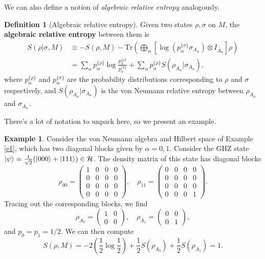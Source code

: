 \documentclass[12pt,a4paper]{report}
\numberwithin{equation}{section}
\newcommand{\ol}[1]{\overline{#1}}
\newcommand{\tr}{\text{Tr}}
\theoremstyle{definition}
\newtheorem{definition}{Definition}[section]
\theoremstyle{theorem}
\theoremstyle{theorem}
\theoremstyle{example}
\newtheorem{example}{Example}[section]
\theoremstyle{definition}
\begin{document}
We can also define a notion of \textit{algebraic relative entropy} analogously.
\begin{definition}[Algebraic relative entropy]
	Given two states $\rho,\sigma$ on $M$, the \textbf{algebraic relative entropy} between them is
	\begin{equation}
		\begin{aligned}
			S(\rho|\sigma,M)&\equiv-S(\rho,M)-\tr\left(\bigoplus_{\alpha}\left[\log\left(p_{\alpha}^{\{\sigma\}}\sigma_{A_{\alpha}}\right)\otimes I_{\ol{A}_{\alpha}}\right]\rho\right)\\&=\sum_{\alpha}p_{\alpha}^{\{\rho\}}\log\frac{p_{\alpha}^{\{\rho\}}}{p_{\alpha}^{\{\sigma\}}}+\sum_{\alpha}p_{\alpha}^{\{\rho\}}S(\rho_{A_{\alpha}}|\sigma_{A_{\alpha}}),
		\end{aligned}
	\end{equation}
	where $p_{\alpha}^{\{\rho\}}$ and $p_{\alpha}^{\{\sigma\}}$ are the probability distributions corresponding to $\rho$ and $\sigma$ respectively, and $S(\rho_{A_{\alpha}}|\sigma_{A_{\alpha}})$ is the von Neumann relative entropy between $\rho_{A_{\alpha}}$ and $\sigma_{A_{\alpha}}$.
\end{definition}
There's a lot of notation to unpack here, so we present an example.
\begin{example}
	Consider the von Neumann algebra and Hilbert space of Example \ref{e1}, which has two diagonal blocks given by $\alpha=0,1$. Consider the GHZ state $\ket{\psi}=\frac{1}{\sqrt{2}}(\ket{000}+\ket{111})\in\mathcal{H}$. The density matrix of this state has diagonal blocks
	\begin{equation}
		\rho_{00}=\begin{pmatrix}
			1&0&0&0\\
			0&0&0&0\\
			0&0&0&0\\
			0&0&0&0
		\end{pmatrix},\quad\rho_{11}=\begin{pmatrix}
		0&0&0&0\\
		0&0&0&0\\
		0&0&0&0\\
		0&0&0&1
	\end{pmatrix}.
	\end{equation}
	Tracing out the corresponding blocks, we find
	\begin{equation}
		\rho_{A_{0}}=\begin{pmatrix}1&0\\0&0\end{pmatrix},\quad\rho_{A_{1}}=\begin{pmatrix}0&0\\0&1\end{pmatrix},
	\end{equation}
	and $p_{0}=p_{1}=1/2$. We can then compute
	\begin{equation}
		S(\rho,M)=-2\left(\frac{1}{2}\log\frac{1}{2}\right)+\frac{1}{2}S(\rho_{A_{0}})+\frac{1}{2}S(\rho_{A_{1}})=1.
	\end{equation}
\end{example}
\end{document}
